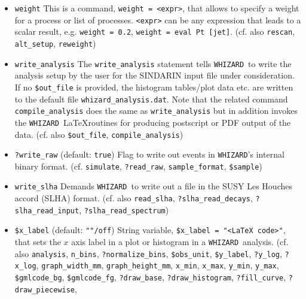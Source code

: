 \documentclass[12pt]{book}
\newcommand{\ttt}[1]{\texttt{#1}}
\newcommand{\whizard}{\texttt{WHIZARD}}
\begin{document}
\begin{itemize}
Optional logical argument for the \ttt{integrate} command that demands
\whizard\ to generate a PDF or postscript output showing the
adaptation history of the Monte-Carlo integration of the process under
consideration. (cf. also \ttt{integrate}, \ttt{?vis\_channels})
\item
\ttt{weight} \newline
This is a command, \ttt{weight = <expr>}, that allows to specify a
weight for a process or list of processes. \ttt{<expr>} can be
any expression that leads to a scalar result, e.g. \ttt{weight = 0.2},
\ttt{weight = eval Pt [jet]}.  (cf. also \ttt{rescan},
\ttt{alt\_setup}, \ttt{reweight})
\item
\ttt{write\_analysis} \newline
The \ttt{write\_analysis} statement tells \whizard\ to write the
analysis setup by the user for the SINDARIN input file under
consideration. If no \ttt{\$out\_file} is provided, the histogram
tables/plot data etc. are written to the default file
\ttt{whizard\_analysis.dat}. Note that the related command
\ttt{compile\_analysis} does the same as \ttt{write\_analysis} but in
addition invokes the \whizard\ \LaTeX routines for producing
postscript or PDF output of the data.
(cf. also \ttt{\$out\_file}, \ttt{compile\_analysis})
\item
\ttt{?write\_raw} \qquad (default: \ttt{true}) \newline
Flag to write out events in \whizard's internal binary
format. (cf. \ttt{simulate}, \ttt{?read\_raw}, \ttt{sample\_format},
\ttt{\$sample})
\item
\ttt{write\_slha} \newline
Demands \whizard\ to write out a file in the SUSY Les Houches accord
(SLHA) format. (cf. also \ttt{read\_slha}, \ttt{?slha\_read\_decays},
\ttt{?slha\_read\_input}, \ttt{?slha\_read\_spectrum})
\item
\ttt{\$x\_label} \qquad (default: \ttt{""/off}) \newline
String variable, \ttt{\$x\_label = "<LaTeX code>"}, that sets the $x$
axis label in a plot or histogram in a \whizard\ analysis. 
(cf. also \ttt{analysis}, 
\ttt{n\_bins}, \ttt{?normalize\_bins}, \ttt{\$obs\_unit},
\ttt{\$y\_label}, \ttt{?y\_log}, \ttt{?x\_log},
\ttt{graph\_width\_mm}, \ttt{graph\_height\_mm}, 
\ttt{x\_min}, \ttt{x\_max}, \ttt{y\_min}, \ttt{y\_max},
\newline \ttt{\$gmlcode\_bg}, \ttt{\$gmlcode\_fg}, \ttt{?draw\_base},
\ttt{?draw\_histogram}, \ttt{?fill\_curve}, \newline \ttt{?draw\_piecewise}, 

\end{itemize}
\end{document}
